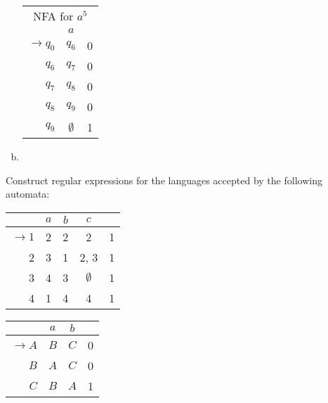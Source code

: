 \begin{solution}
\begin{enumerate}[(a)]
\begin{center}\begin{tabular}[t]{r c r}
    \multicolumn{3}{c}{NFA for \(a^5\)}\\
    & \(a\) & \\\bottomrule
    \(\to q_0\) & \(q_6\) & 0\\
    \(q_6\) & \(q_7\) & 0\\
    \(q_7\) & \(q_8\) & 0\\
    \(q_8\) & \(q_9\) & 0\\
    \(q_9\) & \(\emptyset \) & 1              
\end{tabular}\end{center}
\item 
\end{enumerate}
\end{solution}
\begin{exercise}{4}
Construct regular expressions for the languages accepted by the following automata:
\begin{enumerate}[(a)]
\begin{multicols}{2}
    \item \begin{tabular}[t]{r c c c c}
         & \(a\) & \(b\) & \(c\) & \\\bottomrule
         \(\to1\)  & 2 & 2 & 2 & 1\\
               2 & 3 & 1 & 2, 3 & 1\\
               3 & 4 & 3 & \(\emptyset \) & 1\\
               4 & 1 & 4 & 4 & 1
    \end{tabular}
    \item \begin{tabular}[t]{r c c c}
         & \(a\) & \(b\) & \\\bottomrule
         \(\to A\) & \(B\) & \(C\) & 0\\
               \(B\) & \(A\) & \(C\) & 0\\
               \(C\) & \(B\) & \(A\) & 1 
    \end{tabular}
\end{multicols}
\end{enumerate}
\end{exercise}

